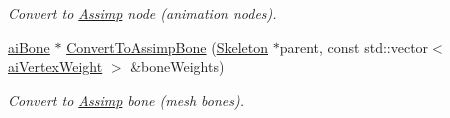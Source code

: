\begin{DoxyCompactItemize}
\begin{DoxyCompactList}\small\item\em Convert to \hyperlink{class_assimp}{Assimp} node (animation nodes). \end{DoxyCompactList}\item 
\hypertarget{class_assimp_1_1_ogre_1_1_bone_abed99b3d23d7ffd3c360d47ccc981328}{\hyperlink{structai_bone}{ai\+Bone} $\ast$ \hyperlink{class_assimp_1_1_ogre_1_1_bone_abed99b3d23d7ffd3c360d47ccc981328}{Convert\+To\+Assimp\+Bone} (\hyperlink{class_assimp_1_1_ogre_1_1_skeleton}{Skeleton} $\ast$parent, const std\+::vector$<$ \hyperlink{structai_vertex_weight}{ai\+Vertex\+Weight} $>$ \&bone\+Weights)}\label{class_assimp_1_1_ogre_1_1_bone_abed99b3d23d7ffd3c360d47ccc981328}

\begin{DoxyCompactList}\small\item\em Convert to \hyperlink{class_assimp}{Assimp} bone (mesh bones). \end{DoxyCompactList}\end{DoxyCompactItemize}
